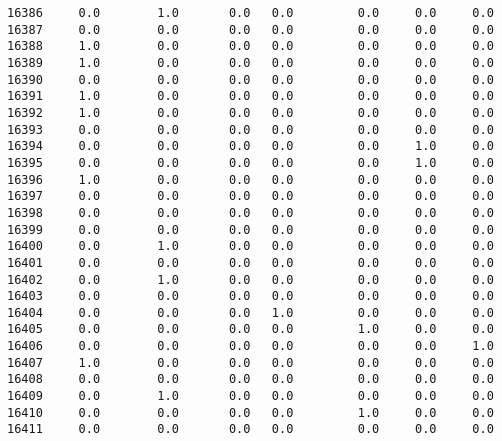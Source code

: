 \documentclass[11pt]{article}
\begin{document}
\begin{verbatim}
16386     0.0        1.0       0.0   0.0         0.0     0.0     0.0   
16387     0.0        0.0       0.0   0.0         0.0     0.0     0.0   
16388     1.0        0.0       0.0   0.0         0.0     0.0     0.0   
16389     1.0        0.0       0.0   0.0         0.0     0.0     0.0   
16390     0.0        0.0       0.0   0.0         0.0     0.0     0.0   
16391     1.0        0.0       0.0   0.0         0.0     0.0     0.0   
16392     1.0        0.0       0.0   0.0         0.0     0.0     0.0   
16393     0.0        0.0       0.0   0.0         0.0     0.0     0.0   
16394     0.0        0.0       0.0   0.0         0.0     1.0     0.0   
16395     0.0        0.0       0.0   0.0         0.0     1.0     0.0   
16396     1.0        0.0       0.0   0.0         0.0     0.0     0.0   
16397     0.0        0.0       0.0   0.0         0.0     0.0     0.0   
16398     0.0        0.0       0.0   0.0         0.0     0.0     0.0   
16399     0.0        0.0       0.0   0.0         0.0     0.0     0.0   
16400     0.0        1.0       0.0   0.0         0.0     0.0     0.0   
16401     0.0        0.0       0.0   0.0         0.0     0.0     0.0   
16402     0.0        1.0       0.0   0.0         0.0     0.0     0.0   
16403     0.0        0.0       0.0   0.0         0.0     0.0     0.0   
16404     0.0        0.0       0.0   1.0         0.0     0.0     0.0   
16405     0.0        0.0       0.0   0.0         1.0     0.0     0.0   
16406     0.0        0.0       0.0   0.0         0.0     0.0     1.0   
16407     1.0        0.0       0.0   0.0         0.0     0.0     0.0   
16408     0.0        0.0       0.0   0.0         0.0     0.0     0.0   
16409     0.0        1.0       0.0   0.0         0.0     0.0     0.0   
16410     0.0        0.0       0.0   0.0         1.0     0.0     0.0   
16411     0.0        0.0       0.0   0.0         0.0     0.0     0.0   


\end{verbatim}
\end{document}
